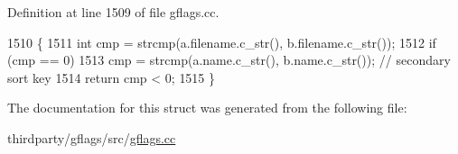 Definition at line 1509 of file gflags.\+cc.


\begin{DoxyCode}
1510                                                       \{
1511     \textcolor{keywordtype}{int} cmp = strcmp(a.filename.c\_str(), b.filename.c\_str());
1512     \textcolor{keywordflow}{if} (cmp == 0)
1513       cmp = strcmp(a.name.c\_str(), b.name.c\_str());  \textcolor{comment}{// secondary sort key}
1514     \textcolor{keywordflow}{return} cmp < 0;
1515   \}
\end{DoxyCode}


The documentation for this struct was generated from the following file\+:\begin{DoxyCompactItemize}
\item 
thirdparty/gflags/src/\hyperlink{gflags_8cc}{gflags.\+cc}\end{DoxyCompactItemize}
